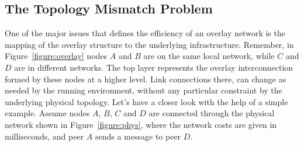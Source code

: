 %
%





\subsection{The Topology Mismatch Problem}

One of the major issues that defines the efficiency of an overlay network is the
mapping of the overlay structure to the underlying infrastructure. Remember, in
Figure~\ref{figure:overlay} nodes $A$ and $B$ are on the same local network,
while $C$ and $D$ are in different networks. The top layer represents the
overlay interconnection formed by these nodes at a higher level. Link
connections there, can change as needed by the running environment, without any
particular constraint by the underlying physical topology. Let's have a closer
look with the help of a simple example. Assume nodes $A$, $B$, $C$ and $D$ are
connected through the physical network shown in Figure~\ref{figure:phys}, where
the network costs are given in milliseconds, and peer $A$ sends a message to
peer $D$.


